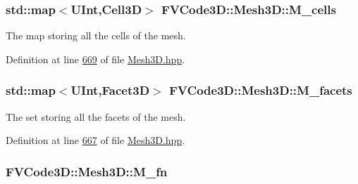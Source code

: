 \subsubsection[{\texorpdfstring{M\+\_\+cells}{M_cells}}]{\setlength{\rightskip}{0pt plus 5cm}std\+::map$<${\bf U\+Int},{\bf Cell3D}$>$ F\+V\+Code3\+D\+::\+Mesh3\+D\+::\+M\+\_\+cells\hspace{0.3cm}{\ttfamily [protected]}}\hypertarget{classFVCode3D_1_1Mesh3D_a8cac877e809226fb96078183efb25a2f}{}\label{classFVCode3D_1_1Mesh3D_a8cac877e809226fb96078183efb25a2f}


The map storing all the cells of the mesh. 



Definition at line \hyperlink{Mesh3D_8hpp_source_l00669}{669} of file \hyperlink{Mesh3D_8hpp_source}{Mesh3\+D.\+hpp}.

\subsubsection[{\texorpdfstring{M\+\_\+facets}{M_facets}}]{\setlength{\rightskip}{0pt plus 5cm}std\+::map$<${\bf U\+Int},{\bf Facet3D}$>$ F\+V\+Code3\+D\+::\+Mesh3\+D\+::\+M\+\_\+facets\hspace{0.3cm}{\ttfamily [protected]}}\hypertarget{classFVCode3D_1_1Mesh3D_a57d8b6af7f4385d749c2d83c235764de}{}\label{classFVCode3D_1_1Mesh3D_a57d8b6af7f4385d749c2d83c235764de}


The set storing all the facets of the mesh. 



Definition at line \hyperlink{Mesh3D_8hpp_source_l00667}{667} of file \hyperlink{Mesh3D_8hpp_source}{Mesh3\+D.\+hpp}.

\subsubsection[{\texorpdfstring{M\+\_\+fn}{M_fn}}]{ F\+V\+Code3\+D\+::\+Mesh3\+D\+::\+M\+\_\+fn\hspace{0.3cm}{\ttfamily [protected]}}\hypertarget{classFVCode3D_1_1Mesh3D_ab197671318545b2b026899d435e79ddd}{}\label{classFVCode3D_1_1Mesh3D_ab197671318545b2b026899d435e79ddd}


